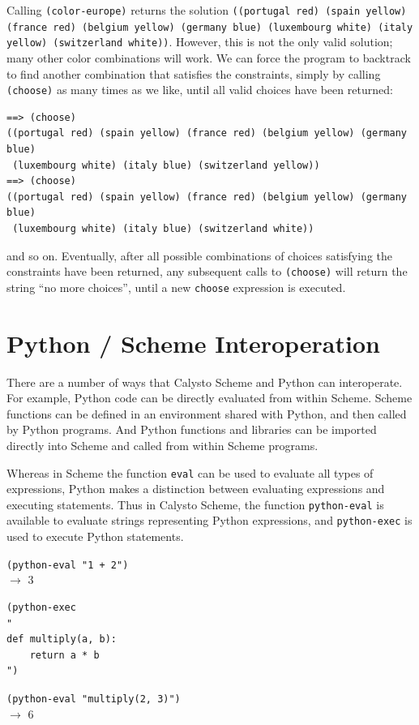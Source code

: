 \documentclass[acmsmall,screen,nonacm]{acmart}
\begin{document}
\noindent
Calling \texttt{(color-europe)} returns the solution \texttt{((portugal red)
(spain yellow) (france red) (belgium yellow) (germany blue) (luxembourg
white) (italy yellow) (switzerland white))}. However, this is not the only
valid solution; many other color combinations will work.  We can force the
program to backtrack to find another combination that satisfies the
constraints, simply by calling \texttt{(choose)} as many times as we like,
until all valid choices have been returned:

{\small
\begin{verbatim}
==> (choose)
((portugal red) (spain yellow) (france red) (belgium yellow) (germany blue)
 (luxembourg white) (italy blue) (switzerland yellow))
==> (choose)
((portugal red) (spain yellow) (france red) (belgium yellow) (germany blue)
 (luxembourg white) (italy blue) (switzerland white))
\end{verbatim}
}

\noindent
and so on.  Eventually, after all possible combinations of choices satisfying
the constraints have been returned, any subsequent calls to \texttt{(choose)}
will return the string ``no more choices'', until a new \texttt{choose}
expression is executed.

\section{Python / Scheme Interoperation}

There are a number of ways that Calysto Scheme and Python can interoperate. For
example, Python code can be directly evaluated from within Scheme. Scheme
functions can be defined in an environment shared with Python, and then called
by Python programs. And Python functions and libraries can be imported directly
into Scheme and called from within Scheme programs.

Whereas in Scheme the function \texttt{eval} can be used to evaluate all types
of expressions, Python makes a distinction between evaluating expressions and
executing statements. Thus in Calysto Scheme, the function \texttt{python-eval} is
available to evaluate strings representing Python expressions, and
\texttt{python-exec} is used to execute Python statements.\\

{\small
\noindent
\texttt{(python-eval "1 + 2")}\\
$\rightarrow$ 3

\noindent
\begin{verbatim}
(python-exec
"
def multiply(a, b):
    return a * b
")
\end{verbatim}
\noindent\texttt{(python-eval "multiply(2, 3)")}\\
$\rightarrow$ 6\\
}
\end{document}
